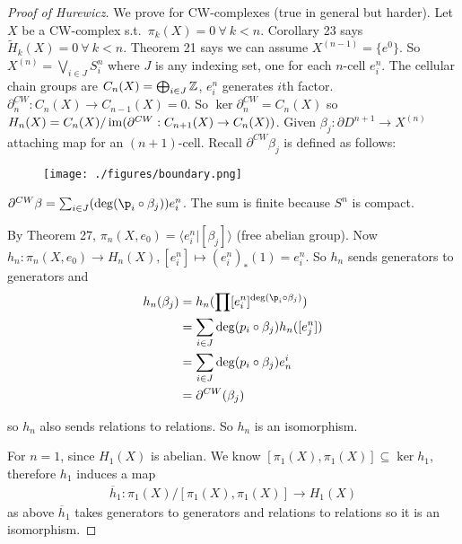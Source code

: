\documentclass[12pt,class=article,crop=false]{standalone}
\begin{document}
\begin{proof}[Proof of Hurewicz]
We prove for CW-complexes (true in general but harder). Let $ X$ be a CW-complex  s.t.\ $ \pi_k(X) = 0 \ \forall \ k <n$. Corollary 23 says $ \widetilde{ H}_k(X) = 0 \ \forall \ k <n$. Theorem 21 says we can assume $ X^{(n-1)} = \{e^{0}\} $. So $ X^{(n)} = \bigvee_{i \in J} S_i^{n}$ where $ J$ is any indexing set, one for each $ n$-cell  $ e_i^{n}$. The cellular chain groups are $ C_n(X) = \bigoplus_{ i \in J} \mathbb{Z}$, $ e_i^{n}$ generates $ i$th factor.  $ \partial_n^{CW}: C_n(X) \to C_{n-1}(X) = 0$. So $ \ker \partial _n^{CW} = C_n(X)$ so $ H_n(X) = C_n(X) / \operatorname{im} (\partial ^{CW}: C_{n+1}(X) \to C_n(X))$. Given  $ \beta_j: \partial D^{n+1} \to X^{(n)}$ attaching map for an $ (n+1)$-cell. Recall  $ \partial ^{CW} \beta_j$ is defined as follows:
~\begin{figure}[H]
	\centering
	\texttt{[image: ./figures/boundary.png]}
\end{figure}
$ \partial ^{CW} \beta = \sum_{i \in J} (\deg (\p_i \circ \beta_j))e_i^{n}$. The sum is finite because $ S^{n}$ is compact.

By Theorem 27, $ \pi_n(X,e_0) = \langle e_i^{n}| [ \beta_j] \rangle$ (free abelian group). Now $ h_n: \pi_n(X,e_0) \to H_n(X), [e_i^{n}] \mapsto (e_i^{n})_*(1) = e_i^{n}$. So $ h_n$ sends generators to generators and
\begin{align*}
	h_n( \beta_j) &= h_n(\prod [e_i^{n}]^{\deg (\p_i \circ \beta_j)})\\
&= \sum_{i \in J} \deg ( p_i \circ \beta_j) h_n([e_j^{n}])\\
&= \sum_{i \in J} \deg (p_i \circ \beta_j) e_n^{i} \\
&= \partial^{CW} ( \beta_j) 
\end{align*}

so $ h_n$ also sends relations to relations. So $ h_n$ is an isomorphism.

For $ n=1$, since  $ H_1(X)$ is abelian. We know $ [\pi_1(X),\pi_1(X)] \subseteq \ker h_1$, therefore $ h_1$ induces a map
\begin{align*}
	\overline{h}_1: \pi_1(X) / [\pi_1(X),\pi_1(X)] \to H_1(X)
\end{align*}
as above $ \overline{h}_1$ takes generators to generators and relations to relations so it is an isomorphism.
\end{proof}
\end{document}
